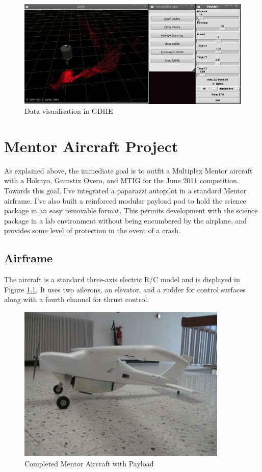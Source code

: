 \documentclass[a4paper,11pt]{report}
\begin{document}
\begin{figure}[ht]
 \centering
 \includegraphics[width=12cm]{./Hoku2gdhe.png}
 \caption{Data visualisation in GDHE}
 \label{fig:hoku2gdhe}
\end{figure}


\chapter{Mentor Aircraft Project}
\label{sec:mentorproject}

As explained above, the immediate goal is to outfit a Multiplex Mentor aircraft with a Hokuyo, Gumstix Overo, and MTIG for the June 2011 competition. Towards this goal, I've integrated a paparazzi autopilot in a standard Mentor airframe. I've also built a reinforced modular payload pod to hold the science package in an easy removable format. This permits development with the science package in a lab environment without being encumbered by the airplane, and provides some level of protection in the event of a crash.

\section{Airframe}

The aircraft is a standard three-axis electric R/C model and is displayed in Figure \ref{fig:mentor}. It uses two ailerons, an elevator, and a rudder for control surfaces along with a fourth channel for thrust control.

\begin{figure}[ht]
 \centering
 \includegraphics[width=10cm]{./800px-Mentor1_2.jpg}
 \caption{Completed Mentor Aircraft with Payload}
 \label{fig:mentor}
\end{figure}
\end{document}
